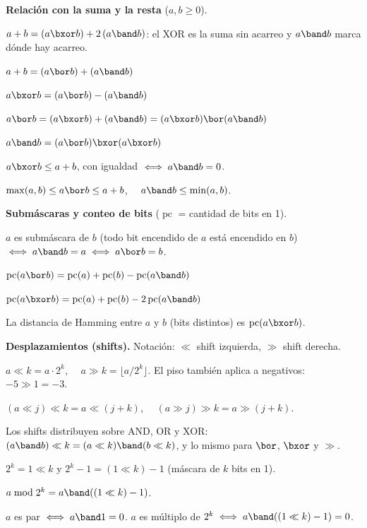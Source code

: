 \textbf{Relación con la suma y la resta} (\(a, b \ge 0\)).
\begin{props}
  \item \(a + b = (a \bxor b) + 2\,(a \band b)\): el XOR es la suma sin acarreo y \(a \band b\) marca dónde hay acarreo.
  \item \(a + b = (a \bor b) + (a \band b)\)
  \item \(a \bxor b = (a \bor b) - (a \band b)\)
  \item \(a \bor b = (a \bxor b) + (a \band b) = (a \bxor b) \bor (a \band b)\)
  \item \(a \band b = (a \bor b) \bxor (a \bxor b)\)
  \item \(a \bxor b \le a + b\), con igualdad \(\iff a \band b = 0\).
  \item \(\max(a,b) \le a \bor b \le a + b\), \(\quad a \band b \le \min(a,b)\).
\end{props}

\textbf{Submáscaras y conteo de bits} (\(\operatorname{pc}\) = cantidad de bits en 1).
\begin{props}
  \item \(a\) es submáscara de \(b\) (todo bit encendido de \(a\) está encendido en \(b\)) \(\iff a \band b = a \iff a \bor b = b\).
  \item \(\operatorname{pc}(a \bor b) = \operatorname{pc}(a) + \operatorname{pc}(b) - \operatorname{pc}(a \band b)\)
  \item \(\operatorname{pc}(a \bxor b) = \operatorname{pc}(a) + \operatorname{pc}(b) - 2\operatorname{pc}(a \band b)\)
  \item La distancia de Hamming entre \(a\) y \(b\) (bits distintos) es \(\operatorname{pc}(a \bxor b)\).
\end{props}

\textbf{Desplazamientos (shifts).} Notación: \(\ll\) shift izquierda, \(\gg\) shift derecha.
\begin{props}
  \item \(a \ll k = a \cdot 2^k\), \(\quad a \gg k = \lfloor a / 2^k \rfloor\). El piso también aplica a negativos: \(-5 \gg 1 = -3\).
  \item \((a \ll j) \ll k = a \ll (j+k)\), \(\quad (a \gg j) \gg k = a \gg (j+k)\).
  \item Los shifts distribuyen sobre AND, OR y XOR: \((a \band b) \ll k = (a \ll k) \band (b \ll k)\), y lo mismo para \(\bor\), \(\bxor\) y \(\gg\).
  \item \(2^k = 1 \ll k\) y \(2^k - 1 = (1 \ll k) - 1\) (máscara de \(k\) bits en 1).
  \item \(a \bmod 2^k = a \band ((1 \ll k) - 1)\).
  \item \(a\) es par \(\iff a \band 1 = 0\). \(a\) es múltiplo de \(2^k \iff a \band ((1 \ll k) - 1) = 0\).
\end{props}

